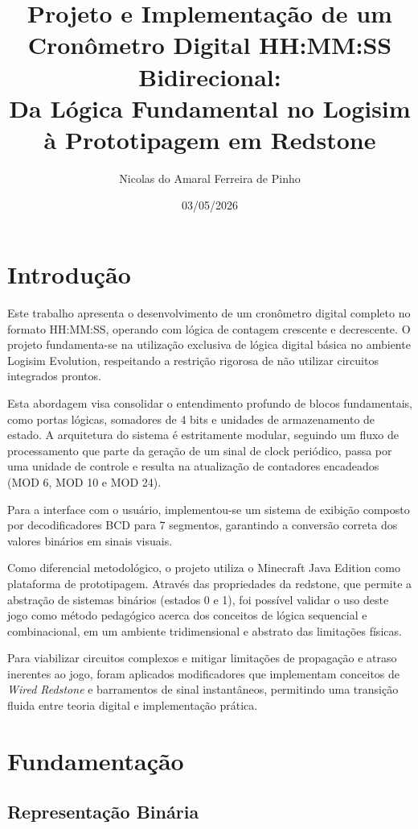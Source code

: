 \documentclass[a4paper,12pt]{article}
\title{Projeto e Implementação de um Cronômetro Digital HH:MM:SS Bidirecional:\\
Da Lógica Fundamental no Logisim à Prototipagem em Redstone}
\author{Nicolas do Amaral Ferreira de Pinho}
\date{03/05/2026}
\begin{document}
\maketitle
\newpage
\tableofcontents
\newpage

\section{Introdução}

Este trabalho apresenta o desenvolvimento de um cronômetro digital completo no formato HH:MM:SS, operando com lógica de contagem crescente e decrescente. O projeto fundamenta-se na utilização exclusiva de lógica digital básica no ambiente Logisim Evolution, respeitando a restrição rigorosa de não utilizar circuitos integrados prontos.

Esta abordagem visa consolidar o entendimento profundo de blocos fundamentais, como portas lógicas, somadores de 4 bits e unidades de armazenamento de estado. A arquitetura do sistema é estritamente modular, seguindo um fluxo de processamento que parte da geração de um sinal de clock periódico, passa por uma unidade de controle e resulta na atualização de contadores encadeados (MOD 6, MOD 10 e MOD 24).

Para a interface com o usuário, implementou-se um sistema de exibição composto por decodificadores BCD para 7 segmentos, garantindo a conversão correta dos valores binários em sinais visuais.

Como diferencial metodológico, o projeto utiliza o Minecraft Java Edition como plataforma de prototipagem. Através das propriedades da redstone, que permite a abstração de sistemas binários (estados 0 e 1), foi possível validar o uso deste jogo como método pedagógico acerca dos conceitos de lógica sequencial e combinacional, em um ambiente tridimensional e abstrato das limitações físicas.

Para viabilizar circuitos complexos e mitigar limitações de propagação e atraso inerentes ao jogo, foram aplicados modificadores que implementam conceitos de \textit{Wired Redstone} e barramentos de sinal instantâneos, permitindo uma transição fluida entre teoria digital e implementação prática.

\newpage

\section{Fundamentação}

\subsection{Representação Binária}
\end{document}
